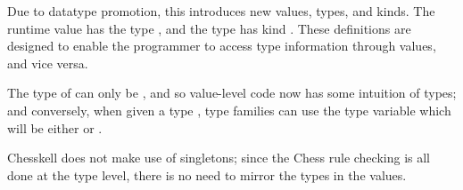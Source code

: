 Due to datatype promotion, this introduces new values, types, and kinds. The runtime value  has the type , and the type  has kind . These definitions are designed to enable the programmer to access type information through values, and vice versa.

The type of  can only be , and so value-level code now has some intuition of types; and conversely, when given a type , type families can use the type variable  which will be either  or .

Chesskell does not make use of singletons; since the Chess rule checking is all done at the type level, there is no need to mirror the types in the values.